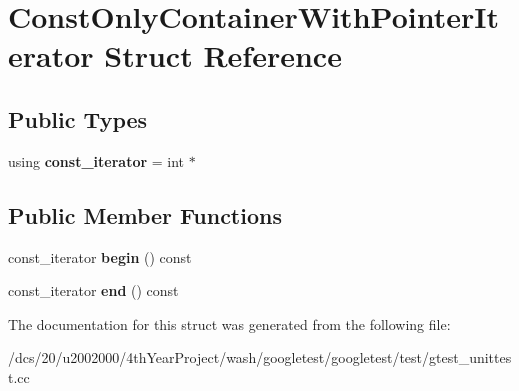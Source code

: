 \hypertarget{structConstOnlyContainerWithPointerIterator}{}\section{Const\+Only\+Container\+With\+Pointer\+Iterator Struct Reference}
\label{structConstOnlyContainerWithPointerIterator}
\subsection*{Public Types}
\begin{DoxyCompactItemize}
\item 
\mbox{\label{structConstOnlyContainerWithPointerIterator_a652efbd2c6da61e65cc45123e4182713}} 
using {\bfseries const\+\_\+iterator} = int $\ast$
\end{DoxyCompactItemize}
\subsection*{Public Member Functions}
\begin{DoxyCompactItemize}
\item 
\mbox{\label{structConstOnlyContainerWithPointerIterator_a3dd48a5028ca3c3bed0a10d7c5fa938b}} 
const\+\_\+iterator {\bfseries begin} () const
\item 
\mbox{\label{structConstOnlyContainerWithPointerIterator_a041683280e1319a08467fa9035098cff}} 
const\+\_\+iterator {\bfseries end} () const
\end{DoxyCompactItemize}


The documentation for this struct was generated from the following file\+:\begin{DoxyCompactItemize}
\item 
/dcs/20/u2002000/4th\+Year\+Project/wash/googletest/googletest/test/gtest\+\_\+unittest.\+cc\end{DoxyCompactItemize}
